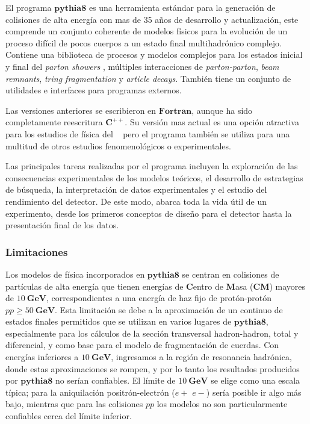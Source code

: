 El programa $\mathbf{pythia8}$ \citep{sjostrand_introduction_2015} es una herramienta estándar para la generación de colisiones de alta energía con mas de 35 a\~nos de desarrollo y actualización, este comprende un conjunto coherente de modelos físicos para la evolución de un proceso difícil de pocos cuerpos a un estado final multihadrónico complejo. Contiene una biblioteca de procesos y modelos complejos para los estados inicial y final del \textit{parton showers} \citep{nagy_what_2018}, múltiples interacciones de \textit{parton-parton}, \textit{beam remnants}, \textit{tring fragmentation} y \textit{article decays}. También tiene un conjunto de utilidades e interfaces para programas externos.  

Las versiones anteriores se escribieron en $\mathbf{Fortran}$, aunque ha sido completamente reescritura $\mathbf{C^{++}}$. Su versión mas actual es una opción atractiva para los estudios de física del \LHC ~ pero el programa también se utiliza para una multitud de otros estudios fenomenológicos o experimentales.

Las principales tareas realizadas por el programa incluyen la exploración de las consecuencias experimentales de los modelos teóricos, el desarrollo de estrategias de búsqueda, la interpretación de datos experimentales y el estudio del rendimiento del detector. De este modo, abarca toda la vida útil de un experimento, desde los primeros conceptos de diseño para el detector hasta la presentación final de los datos. %

\subsubsection{Limitaciones}

Los modelos de física incorporados en $\mathbf{pythia8}$ se centran en colisiones de partículas de alta energía que tienen energías de \textbf{C}entro de \textbf{M}asa (\textbf{CM}) mayores de $10 ~ \mathbf{GeV}$, correspondientes a una energía de haz fijo de protón-protón $pp \geq 50 ~ \mathbf{GeV}$. Esta limitación se debe a la aproximación de un continuo de estados finales permitidos que se utilizan en varios lugares de $\mathbf{pythia8}$, especialmente para los cálculos de la sección transversal hadron-hadron, total y diferencial, y como base para el modelo de fragmentación de cuerdas. Con energías inferiores a $10 ~ \mathbf{GeV}$, ingresamos a la región de resonancia hadrónica, donde estas aproximaciones se rompen, y por lo tanto los resultados producidos por $\mathbf{pythia8}$ no serían confiables. El límite de $10 ~ \mathbf{GeV}$ se elige como una escala típica; para la aniquilación positrón-electrón ($e+$ $e-$) sería posible ir algo más bajo, mientras que para las colisiones $pp$ los modelos no son particularmente confiables cerca del límite inferior.

